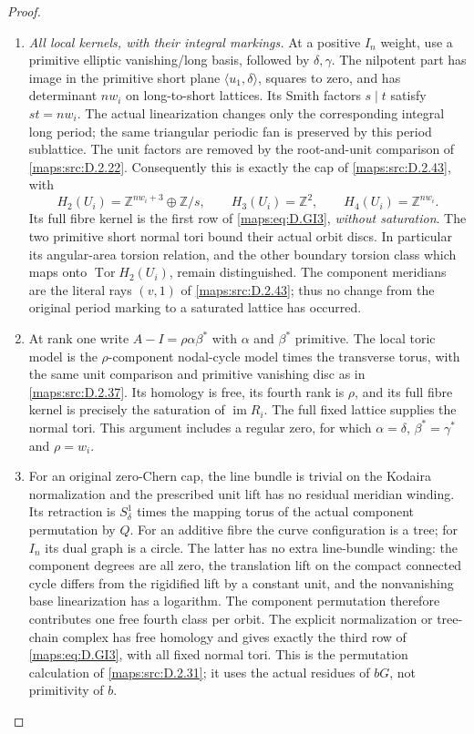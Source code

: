 \begin{proof}
\begin{enumerate}[label=\arabic*.,leftmargin=*]
\item \emph{All local kernels, with their integral markings.}
At a positive $I_n$ weight, use a primitive elliptic
vanishing/long basis, followed by $\delta,\gamma$.
The nilpotent part has image in the primitive short
plane $\langle u_1,\delta\rangle$, squares to zero,
and has determinant $nw_i$ on long-to-short lattices.
Its Smith factors $s\mid t$ satisfy $st=nw_i$.
The actual linearization changes only the corresponding
integral long period; the same triangular periodic fan
is preserved by this period sublattice. The unit factors
are removed by the root-and-unit comparison of \ref{maps:src:D.2.22}.
Consequently this is exactly the cap of \ref{maps:src:D.2.43}, with
\[
 H_2(U_i)=\mathbb Z^{nw_i+3}\oplus\mathbb Z/s,
 \qquad H_3(U_i)=\mathbb Z^2,\qquad
 H_4(U_i)=\mathbb Z^{nw_i}.
\]
Its full fibre kernel is the first row of \eqref{maps:eq:D.GI3},
\emph{without saturation}. The two primitive short
normal tori bound their actual orbit discs. In
particular its angular-area torsion relation, and
the other boundary torsion class which maps onto
$\operatorname{Tor}H_2(U_i)$, remain distinguished.
The component meridians are the literal rays $(v,1)$
of \ref{maps:src:D.2.43}; thus no change from the original period
marking to a saturated lattice has occurred.

\item At rank one write $A-I=\rho\alpha\beta^*$ with
$\alpha$ and $\beta^*$ primitive. The local toric
model is the $\rho$-component nodal-cycle model
times the transverse torus, with the same unit
comparison and primitive vanishing disc as in
\ref{maps:src:D.2.37}. Its homology is free, its fourth rank is
$\rho$, and its full fibre kernel is precisely
the saturation of $\operatorname{im}R_i$.
The full fixed lattice supplies the normal tori.
This argument includes a regular zero, for which
$\alpha=\delta$, $\beta^*=\gamma^*$ and $\rho=w_i$.

\item For an original zero-Chern cap, the line bundle is
trivial on the Kodaira normalization and the prescribed
unit lift has no residual meridian winding. Its
retraction is $S^1_\delta$ times the mapping torus
of the actual component permutation by $Q$.
For an additive fibre the curve configuration is
a tree; for $I_n$ its dual graph is a circle.
The latter has no extra line-bundle winding: the
component degrees are all zero, the translation
lift on the compact connected cycle differs from
the rigidified lift by a constant unit, and the
nonvanishing base linearization has a logarithm.
The component permutation therefore contributes
one free fourth class per orbit. The explicit
normalization or tree-chain complex has free
homology and gives exactly the third row of
\eqref{maps:eq:D.GI3}, with all fixed normal tori. This is the
permutation calculation of \ref{maps:src:D.2.31}; it uses the
actual residues of $bG$, not primitivity of $b$.


\end{enumerate}
\end{proof}
